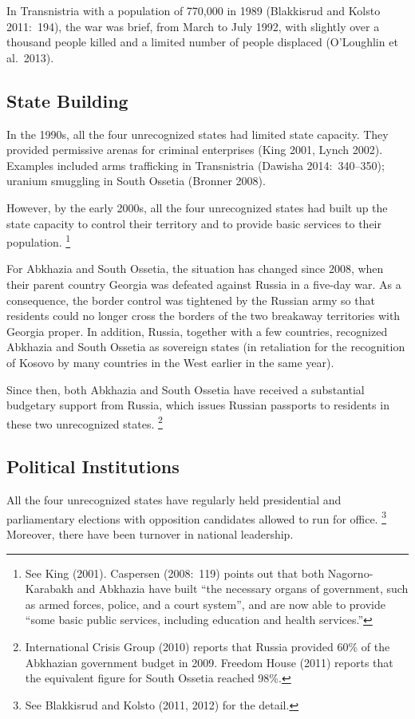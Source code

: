 \documentclass[12pt,a4paper]{article}%
\begin{document}
In Transnistria with a population of 770,000 in 1989 (Blakkisrud and Kolsto 2011:\ 194), the war was brief, from March to July 1992, with slightly over a thousand people killed and a limited number of people displaced (O'Loughlin et al.\ 2013). 

\subsection{State Building}\label{state-building}
In the 1990s, all the four unrecognized states had limited state capacity.
They provided permissive arenas for criminal enterprises (King 2001, Lynch 2002).
Examples included arms trafficking in Transnistria (Dawisha 2014:\ 340--350); uranium smuggling in South Ossetia (Bronner 2008).

However, by the early 2000s, all the four unrecognized states had built up the state capacity to control their territory and to provide basic services to their population.%
\footnote{
	See King (2001). 
	Caspersen (2008:\ 119) points out that both Nagorno-Karabakh and Abkhazia have built ``the necessary organs of government, such as armed forces, police, and a court system'', and are now able to provide ``some basic public services, including education and health services.'' 
}

For Abkhazia and South Ossetia, the situation has changed since 2008, when their parent country Georgia was defeated against Russia in a five-day war. 
As a consequence, the border control was tightened by the Russian army so that residents could no longer cross the borders of the two breakaway territories with Georgia proper.
In addition, Russia, together with a few countries, recognized Abkhazia and South Ossetia as sovereign states (in retaliation for the recognition of Kosovo by many countries in the West earlier in the same year).

Since then, both Abkhazia and South Ossetia have received a substantial budgetary support from Russia, which issues Russian passports to residents in these two unrecognized states.%
\footnote{
	International Crisis Group (2010) reports that Russia provided 60\% of the Abkhazian government budget in 2009.
	Freedom House (2011) reports that the equivalent figure for South Ossetia reached 98\%.
} 

\subsection{Political Institutions}
All the four unrecognized states have regularly held presidential and parliamentary elections with opposition candidates allowed to run for office.%
\footnote{
	See Blakkisrud and Kolsto (2011, 2012) for the detail.
}
Moreover, there have been turnover in national leadership.
\end{document}
